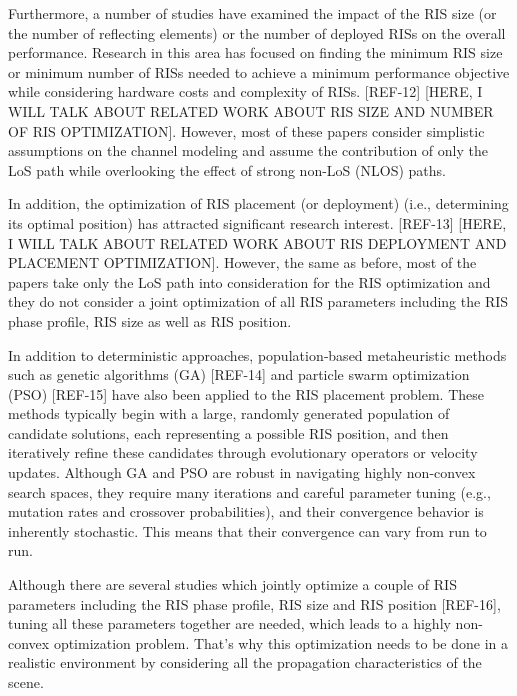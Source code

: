 \documentclass{IEEEoj}
\begin{document}
Furthermore, a number of studies have examined the impact of the RIS size (or the number of reflecting elements) or the number of deployed RISs on the overall performance. Research in this area has focused on finding the minimum RIS size or minimum number of RISs needed to achieve a minimum performance objective while considering hardware costs and complexity of RISs. [REF-12] [HERE, I WILL TALK ABOUT RELATED WORK ABOUT RIS SIZE AND NUMBER OF RIS OPTIMIZATION]. However, most of these papers consider simplistic assumptions on the channel modeling and assume the contribution of only the LoS path while overlooking the effect of strong non-LoS (NLOS) paths.

In addition, the optimization of RIS placement (or deployment) (i.e., determining its optimal position) has attracted significant research interest. [REF-13] [HERE, I WILL TALK ABOUT RELATED WORK ABOUT RIS DEPLOYMENT AND PLACEMENT OPTIMIZATION]. However, the same as before, most of the papers take only the LoS path into consideration for the RIS optimization and they do not consider a joint optimization of all RIS parameters including the RIS phase profile, RIS size as well as RIS position.

In addition to deterministic approaches, population‐based metaheuristic methods such as genetic algorithms (GA) [REF-14] and particle swarm optimization (PSO) [REF-15] have also been applied to the RIS placement problem. These methods typically begin with a large, randomly generated population of candidate solutions, each representing a possible RIS position, and then iteratively refine these candidates through evolutionary operators or velocity updates. Although GA and PSO are robust in navigating highly non-convex search spaces, they require many iterations and careful parameter tuning (e.g., mutation rates and crossover probabilities), and their convergence behavior is inherently stochastic. This means that their convergence can vary from run to run.

Although there are several studies which jointly optimize a couple of RIS parameters including the RIS phase profile, RIS size and RIS position [REF-16], tuning all these parameters together are needed, which leads to a highly non-convex optimization problem. That's why this optimization needs to be done in a realistic environment by considering all the propagation characteristics of the scene.
\end{document}
